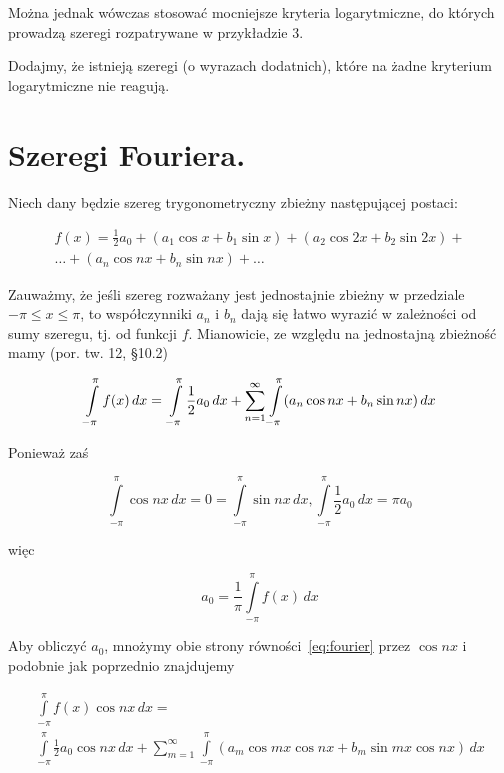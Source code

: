 \documentclass[leqno]{book}
\begin{document}
    Można jednak wówczas stosować mocniejsze kryteria logarytmiczne, do których prowadzą szeregi rozpatrywane w przykładzie 3.

    Dodajmy, że istnieją szeregi (o wyrazach dodatnich), które na żadne kryterium logarytmiczne nie reagują.

    \section{Szeregi Fouriera.}

    Niech dany będzie szereg trygonometryczny zbieżny następującej postaci:

    \begin{multline}
        \label{eq:fourier}
        f(x) = \frac{1}{2} a_{0} + (a_1 \cos x + b_1 \sin x) + (a_2 \cos 2x + b_2 \sin 2x) + \\
        \ldots + (a_n \cos nx + b_n \sin nx) + \ldots
    \end{multline}

    Zauważmy, że jeśli szereg rozważany jest jednostajnie zbieżny w przedziale $-\pi \leq x \leq \pi$,
    to współczynniki $a_n$ i $b_n$ dają się łatwo wyrazić w zależności od sumy szeregu, tj. od funkcji $f$.
    Mianowicie, ze względu na jednostajną zbieżność mamy (por. tw. 12, \S 10.2)

    \[
        \int\limits_{-\pi}^{\pi} f(x)\,dx = \\ \int\limits_{-\pi}^{\pi} \frac{1}{2} a_0 \,dx +
        \sum_{n = 1}^{\infty} \int\limits_{-\pi}^{\pi} (a_n \cos nx + b_n \sin nx) \,dx
    \]

    Ponieważ zaś

    \[
        \int\limits_{-\pi}^{\pi} \cos nx \,dx = 0 = \int\limits_{-\pi}^{\pi} \sin nx \,dx,
        \int\limits_{-\pi}^{\pi} \frac{1}{2} a_0 \,dx = \pi a_0
    \]

    więc

    \begin{equation}
        \label{eq:el0}
        a_0 = \frac{1}{\pi} \int\limits_{-\pi}^{\pi} f(x) \,dx
    \end{equation}

    Aby obliczyć $a_0$, mnożymy obie strony równości~\eqref{eq:fourier} przez $\cos nx$ i podobnie jak poprzednio znajdujemy

    \begin{multline*}
        \int\limits_{-\pi}^{\pi} f(x) \cos nx \,dx = \\ \int\limits_{-\pi}^{\pi} \frac{1}{2} a_0 \cos nx \,dx +
        \sum_{m = 1}^{\infty} \int\limits_{-\pi}^{\pi} (a_m \cos mx \cos nx + b_m \sin mx \cos nx) \,dx
    \end{multline*}
\end{document}
